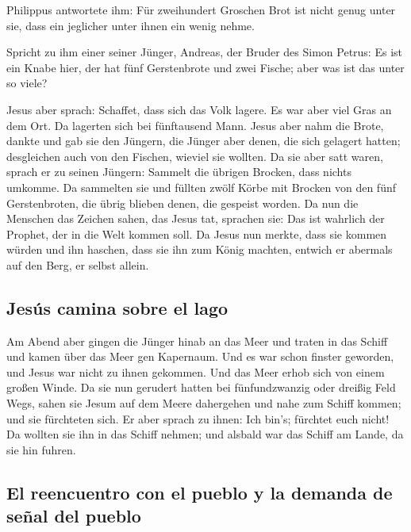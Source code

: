  Philippus antwortete ihm: Für zweihundert Groschen Brot
ist nicht genug unter sie, dass ein jeglicher unter ihnen ein wenig
nehme.

 Spricht zu ihm einer seiner Jünger, Andreas, der Bruder
des Simon Petrus:  Es ist ein Knabe hier, der hat fünf
Gerstenbrote und zwei Fische; aber was ist das unter so viele?

 Jesus aber sprach: Schaffet, dass sich das Volk lagere.
Es war aber viel Gras an dem Ort. Da lagerten sich bei fünftausend Mann.
 Jesus aber nahm die Brote, dankte und gab sie den
Jüngern, die Jünger aber denen, die sich gelagert hatten; desgleichen
auch von den Fischen, wieviel sie wollten.  Da sie aber
satt waren, sprach er zu seinen Jüngern: Sammelt die übrigen Brocken,
dass nichts umkomme.  Da sammelten sie und füllten zwölf
Körbe mit Brocken von den fünf Gerstenbroten, die übrig blieben denen,
die gespeist worden.  Da nun die Menschen das Zeichen
sahen, das Jesus tat, sprachen sie: Das ist wahrlich der Prophet, der in
die Welt kommen soll.  Da Jesus nun merkte, dass sie
kommen würden und ihn haschen, dass sie ihn zum König machten, entwich
er abermals auf den Berg, er selbst allein.

\hypertarget{jesuxfas-camina-sobre-el-lago}{%
\subsection{Jesús camina sobre el
lago}\label{jesuxfas-camina-sobre-el-lago}}

 Am Abend aber gingen die Jünger hinab an das Meer
 und traten in das Schiff und kamen über das Meer gen
Kapernaum. Und es war schon finster geworden, und Jesus war nicht zu
ihnen gekommen.  Und das Meer erhob sich von einem großen
Winde.  Da sie nun gerudert hatten bei fünfundzwanzig
oder dreißig Feld Wegs, sahen sie Jesum auf dem Meere dahergehen und
nahe zum Schiff kommen; und sie fürchteten sich.  Er aber
sprach zu ihnen: Ich bin's; fürchtet euch nicht!  Da
wollten sie ihn in das Schiff nehmen; und alsbald war das Schiff am
Lande, da sie hin fuhren.

\hypertarget{el-reencuentro-con-el-pueblo-y-la-demanda-de-seuxf1al-del-pueblo}{%
\subsection{El reencuentro con el pueblo y la demanda de señal del
pueblo}\label{el-reencuentro-con-el-pueblo-y-la-demanda-de-seuxf1al-del-pueblo}}

